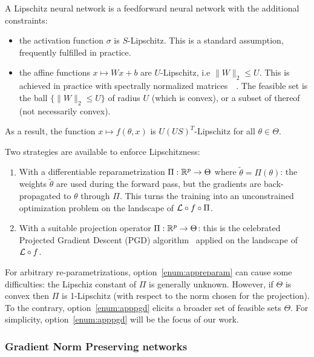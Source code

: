     \begin{definition}\label{def:lipnet}
        A Lipschitz neural network is a feedforward neural network with the additional constraints:
        \begin{itemize}
            \item the activation function $\sigma$ is $S$-Lipschitz. This is a standard assumption, frequently fulfilled in practice.
            \item the affine functions $x\mapsto Wx+b$ are $U$-Lipschitz, i.e $\|W\|_2\leq U$. This is achieved in practice with spectrally normalized matrices~\cite{yoshida2017spectral}~\cite{bartlett2017spectrally}. The feasible set is the ball $\{\|W\|_2\leq U\}$ of radius $U$ (which is convex), or a subset of thereof (not necessarily convex).  
        \end{itemize}
        As a result, the function $x\mapsto f(\theta,x)$ is $U(US)^T$-Lipschitz for all $\theta\in\Theta$. 
    \end{definition}
    
    Two strategies are available to enforce Lipschitzness:
    \begin{enumerate}
        \item With a differentiable reparametrization $\Pi:\mathbb{R}^p\rightarrow\Theta$ where $\tilde\theta=\Pi(\theta)$: the weights $\tilde\theta$ are used during the forward pass, but the gradients are back-propagated to $\theta$ through $\Pi$. This turns the training into an unconstrained optimization problem on the landscape of $\mathcal{L}\circ f\circ \Pi$.\label{enum:appreparam}
        \item With a suitable projection operator $\Pi:\mathbb{R}^p\rightarrow\Theta$: this is the celebrated Projected Gradient Descent (PGD) algorithm~\cite{bubeck2015convex} applied on the landscape of $\mathcal{L}\circ f$.\label{enum:apppgd}  
    \end{enumerate}
    For arbitrary re-parametrizations, option~\ref{enum:appreparam} can cause some difficulties: the Lipschiz constant of $\Pi$ is generally unknown. However, if $\Theta$ is convex then $\Pi$ is 1-Lipschitz (with respect to the norm chosen for the projection). To the contrary, option~\ref{enum:apppgd} elicits a broader set of feasible sets $\Theta$. For simplicity, option~\ref{enum:apppgd} will be the focus of our work.  

    \subsubsection{Gradient Norm Preserving networks}

